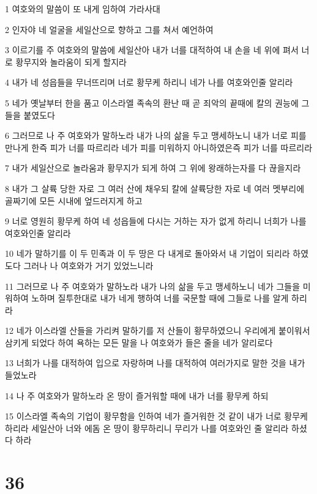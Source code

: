 \par 1 여호와의 말씀이 또 내게 임하여 가라사대
\par 2 인자야 네 얼굴을 세일산으로 향하고 그를 쳐서 예언하여
\par 3 이르기를 주 여호와의 말씀에 세일산아 내가 너를 대적하여 내 손을 네 위에 펴서 너로 황무지와 놀라움이 되게 할지라
\par 4 내가 네 성읍들을 무너뜨리며 너로 황무케 하리니 네가 나를 여호와인줄 알리라
\par 5 네가 옛날부터 한을 품고 이스라엘 족속의 환난 때 곧 죄악의 끝때에 칼의 권능에 그들을 붙였도다
\par 6 그러므로 나 주 여호와가 말하노라 내가 나의 삶을 두고 맹세하노니 내가 너로 피를 만나게 한즉 피가 너를 따르리라 네가 피를 미워하지 아니하였은즉 피가 너를 따르리라
\par 7 내가 세일산으로 놀라움과 황무지가 되게 하여 그 위에 왕래하는자를 다 끊을지라
\par 8 내가 그 살륙 당한 자로 그 여러 산에 채우되 칼에 살륙당한 자로 네 여러 멧부리에 골짜기에 모든 시내에 엎드러지게 하고
\par 9 너로 영원히 황무케 하여 네 성읍들에 다시는 거하는 자가 없게 하리니 너희가 나를 여호와인줄 알리라
\par 10 네가 말하기를 이 두 민족과 이 두 땅은 다 내게로 돌아와서 내 기업이 되리라 하였도다 그러나 나 여호와가 거기 있었느니라
\par 11 그러므로 나 주 여호와가 말하노라 내가 나의 삶을 두고 맹세하노니 네가 그들을 미워하여 노하며 질투한대로 내가 네게 행하여 너를 국문할 때에 그들로 나를 알게 하리라
\par 12 네가 이스라엘 산들을 가리켜 말하기를 저 산들이 황무하였으니 우리에게 붙이워서 삼키게 되었다 하여 욕하는 모든 말을 나 여호와가 들은 줄을 네가 알리로다
\par 13 너희가 나를 대적하여 입으로 자랑하며 나를 대적하여 여러가지로 말한 것을 내가 들었노라
\par 14 나 주 여호와가 말하노라 온 땅이 즐거워할 때에 내가 너를 황무케 하되
\par 15 이스라엘 족속의 기업이 황무함을 인하여 네가 즐거워한 것 같이 내가 너로 황무케 하리라 세일산아 너와 에돔 온 땅이 황무하리니 무리가 나를 여호와인 줄 알리라 하셨다 하라

\chapter{36}

